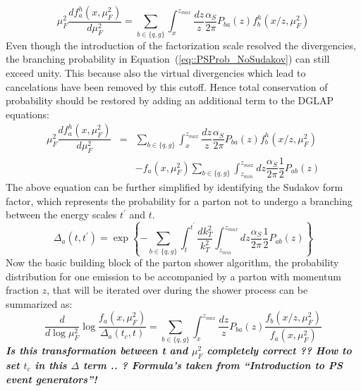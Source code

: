 \begin{equation}\label{eq::PSProb_NoSudakov}
 \mu_{F}^2 \dfrac{d f_{a}^{h}(x,\mu_{F}^{2})}{d \mu_{F}^{2}} = \sum_{b \in \{q,g\} } \int_{x}^{z_{max}} \dfrac{dz}{z} \dfrac{\alpha_{S}}{2 \pi} P_{ba}(z) f_{b}^{h}(x/z, \mu_{F}^{2})
\end{equation}
Even though the introduction of the factorization scale resolved the divergencies, the branching probability in Equation~(\ref{eq::PSProb_NoSudakov}) can still exceed unity. This because also the virtual divergencies which lead to cancelations have been removed by this cutoff. Hence total conservation of probability should be restored by adding an additional term to the DGLAP equations:
\begin{eqnarray}
 \mu_{F}^2 \dfrac{d f_{a}^{h}(x,\mu_{F}^{2})}{d \mu_{F}^{2}} & = & \sum_{b \in \{q,g\} } \int_{x}^{z_{max}} \dfrac{dz}{z} \dfrac{\alpha_{S}}{2 \pi} P_{ba}(z) f_{b}^{h}(x/z, \mu_{F}^{2}) \nonumber \\
                                                             &   & - f_{a}(x,\mu_{F}^{2}) \sum_{b \in \{q,g\}} \int_{z_{min}}^{z_{max}} dz \dfrac{\alpha_{S}}{2 \pi} \dfrac{1}{2} P_{ab}(z)
\end{eqnarray}
The above equation can be further simplified by identifying the Sudakov form factor, which represents the probability for a parton not to undergo a branching between the energy scales $t^{'}$ and $t$.
\begin{equation}
 \Delta_{a}(t,t^{'}) = \exp \left\lbrace - \sum_{b \in \{q,g\}} \int_{t}^{t^{'}} \dfrac{dk_{T}^{2}}{k_{T}^{2}} \int_{z_{min}}^{z_{max}} dz \dfrac{\alpha_{S}}{2 \pi} \dfrac{1}{2} P_{ab}(z) \right\rbrace
\end{equation}
Now the basic building block of the parton shower algorithm, the probability distribution for one emission to be accompanied by a parton with momentum fraction $z$, that will be iterated over during the shower process can be summarized as:
\begin{equation}
 \dfrac{d}{d \log \mu_{F}^{2}} \log \dfrac{f_{a}(x,\mu_{F}^{2})}{\Delta_{a}(t_{c},t)} = \sum_{b \in \{q,g\}} \int_{x}^{z_{max}} \dfrac{dz}{z} P_{ba}(z) \dfrac{f_{b}(x/z,\mu_{F}^{2})}{f_{a}(x,\mu_{F}^{2})}
\end{equation}
\textit{\textbf{Is this transformation between t and $\mu_{F}^{2}$ completely correct ??  How to set $t_c$ in this $\Delta$ term .. ? Formula's taken from ``Introduction to PS event generators''!}}\\

